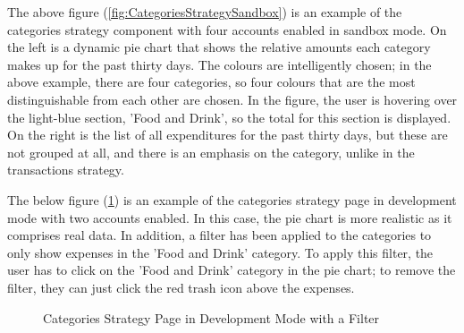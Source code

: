 The above figure (\ref{fig:CategoriesStrategySandbox}) is an example of the categories strategy component with four accounts enabled in sandbox mode. On the left is a dynamic pie chart that shows the relative amounts each category makes up for the past thirty days. The colours are intelligently chosen; in the above example, there are four categories, so four colours that are the most distinguishable from each other are chosen. In the figure, the user is hovering over the light-blue section, 'Food and Drink', so the total for this section is displayed. On the right is the list of all expenditures for the past thirty days, but these are not grouped at all, and there is an emphasis on the category, unlike in the transactions strategy.

The below figure (\ref{fig:CategoriesStrategyDevelopment}) is an example of the categories strategy page in development mode with two accounts enabled. In this case, the pie chart is more realistic as it comprises real data. In addition, a filter has been applied to the categories to only show expenses in the 'Food and Drink' category. To apply this filter, the user has to click on the 'Food and Drink' category in the pie chart; to remove the filter, they can just click the red trash icon above the expenses.

\begin{figure}[H]
	\centering
	\caption{Categories Strategy Page in Development Mode with a Filter}
	\label{fig:CategoriesStrategyDevelopment}
\end{figure}


